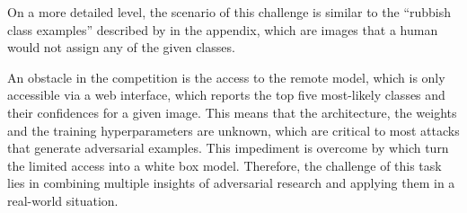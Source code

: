 On a more detailed level, the scenario of this challenge is similar to the \enquote{rubbish class examples} described by \citet{szegedy2015explaining} in the appendix, which are images that a human would not assign any of the given classes.

An obstacle in the competition is the access to the remote model, which is only accessible via a web interface,
which reports the top five most-likely classes and their confidences for a given image.
This means that the architecture, the weights and the training hyperparameters are unknown, which are critical to most attacks that generate adversarial examples.
This impediment is overcome by \citet{papernot2017practical} which turn the limited access into a white box model.
Therefore, the challenge of this task lies in combining multiple insights of adversarial research and applying them in a real-world situation.

